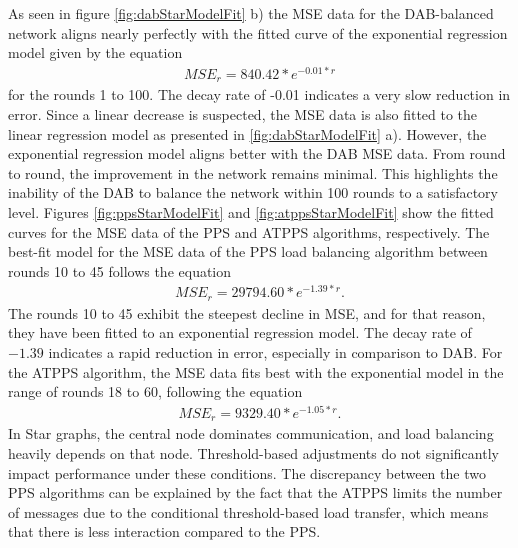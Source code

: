 As seen in figure \ref{fig:dabStarModelFit} b) the MSE data for the DAB-balanced network aligns nearly perfectly with the fitted curve of the exponential regression model given by the equation
\begin{align}
    MSE_r=840.42*e^{-0.01*r}    
\end{align}
for the rounds 1 to 100. The decay rate of -0.01 indicates a very slow reduction in error. Since a linear decrease is suspected, the MSE data is also fitted to the linear regression model as presented in \ref{fig:dabStarModelFit} a). However, the exponential regression model aligns better with the DAB MSE data. From round to round, the improvement in the network remains minimal. This highlights the inability of the DAB to balance the network within 100 rounds to a satisfactory level. Figures \ref{fig:ppsStarModelFit} and \ref{fig:atppsStarModelFit} show the fitted curves for the MSE data of the PPS and ATPPS algorithms, respectively. The best-fit model for the MSE data of the PPS load balancing algorithm between rounds 10 to 45 follows the equation
\begin{align}
    MSE_r=29794.60*e^{-1.39*r}.    
\end{align}
The rounds 10 to 45 exhibit the steepest decline in MSE, and for that reason, they have been fitted to an exponential regression model. The decay rate of $-1.39$ indicates a rapid reduction in error, especially in comparison to DAB. For the ATPPS algorithm, the MSE data fits best with the exponential model in the range of rounds 18 to 60, following the equation
\begin{align}
    MSE_r=9329.40*e^{-1.05*r}.    
\end{align}
In Star graphs, the central node dominates communication, and load balancing heavily depends on that node. Threshold-based adjustments do not significantly impact performance under these conditions. The discrepancy between the two PPS algorithms can be explained by the fact that the ATPPS limits the number of messages due to the conditional threshold-based load transfer, which means that there is less interaction compared to the PPS.

